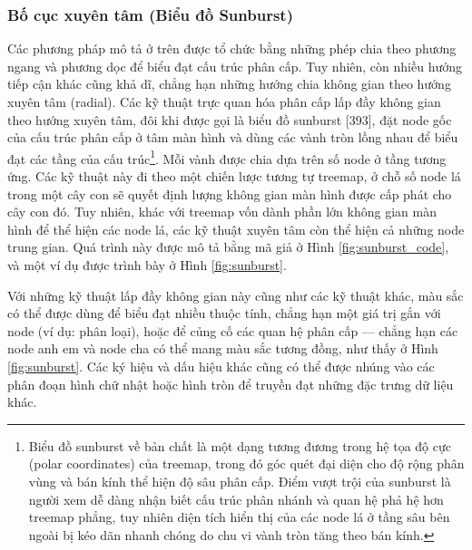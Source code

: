 \documentclass[12pt,a4paper,openany]{book}
\begin{document}
\FloatBarrier
\subsubsection{Bố cục xuyên tâm (Biểu đồ Sunburst)}

Các phương pháp mô tả ở trên được tổ chức bằng những phép chia theo phương ngang và phương dọc để biểu đạt cấu trúc phân cấp. Tuy nhiên, còn nhiều hướng tiếp cận khác cũng khả dĩ, chẳng hạn những hướng chia không gian theo hướng xuyên tâm (radial). Các kỹ thuật trực quan hóa phân cấp lấp đầy không gian theo hướng xuyên tâm, đôi khi được gọi là biểu đồ sunburst [393], đặt node gốc của cấu trúc phân cấp ở tâm màn hình và dùng các vành tròn lồng nhau để biểu đạt các tầng của cấu trúc\footnote{Biểu đồ sunburst về bản chất là một dạng tương đương trong hệ tọa độ cực (polar coordinates) của treemap, trong đó góc quét đại diện cho độ rộng phân vùng và bán kính thể hiện độ sâu phân cấp. Điểm vượt trội của sunburst là người xem dễ dàng nhận biết cấu trúc phân nhánh và quan hệ phả hệ hơn treemap phẳng, tuy nhiên diện tích hiển thị của các node lá ở tầng sâu bên ngoài bị kéo dãn nhanh chóng do chu vi vành tròn tăng theo bán kính.}. Mỗi vành được chia dựa trên số node ở tầng tương ứng. Các kỹ thuật này đi theo một chiến lược tương tự treemap, ở chỗ số node lá trong một cây con sẽ quyết định lượng không gian màn hình được cấp phát cho cây con đó. Tuy nhiên, khác với treemap vốn dành phần lớn không gian màn hình để thể hiện các node lá, các kỹ thuật xuyên tâm còn thể hiện cả những node trung gian. Quá trình này được mô tả bằng mã giả ở Hình \ref{fig:sunburst_code}, và một ví dụ được trình bày ở Hình \ref{fig:sunburst}.

Với những kỹ thuật lấp đầy không gian này cũng như các kỹ thuật khác, màu sắc có thể được dùng để biểu đạt nhiều thuộc tính, chẳng hạn một giá trị gắn với node (ví dụ: phân loại), hoặc để củng cố các quan hệ phân cấp --- chẳng hạn các node anh em và node cha có thể mang màu sắc tương đồng, như thấy ở Hình \ref{fig:sunburst}. Các ký hiệu và dấu hiệu khác cũng có thể được nhúng vào các phân đoạn hình chữ nhật hoặc hình tròn để truyền đạt những đặc trưng dữ liệu khác.
\end{document}
